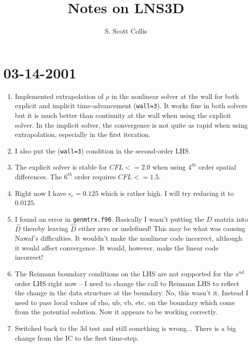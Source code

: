 \documentclass[12pt]{article}
\begin{document}
\title{Notes on LNS3D}
\author{S. Scott Collis}
\maketitle

\section*{03-14-2001}

\begin{enumerate}

\item Implemented extrapolation of $\rho$ in the nonlinear solver at the wall
for both explicit and implicit time-advancement ({\tt wall=3}).  It works fine
in both solvers but it is much better than continuity at the wall when using
the explicit solver.  In the implicit solver, the convergence is not quite as
rapid when using extrapolation, especially in the first iteration.

\item I also put the ({\tt wall=3}) condition in the second-order LHS.

\item The explicit solver is stable for $CFL<=2.0$ when using $4^{th}$ order
spatial differences.  The $6^{th}$ order requires $CFL<=1.5$.

\item Right now I have $\epsilon_e=0.125$ which is rather high.  I will try
reducing it to $0.0125$.

\item I found an error in {\tt genmtrx.f90}.  Basically I wasn't putting the
$D$ matrix into $\hat D$ thereby leaving $\hat D$ either zero or undefined!
This may be what was causing Nawaf's difficulties.  It wouldn't make the
nonlinear code incorrect, although it would affect convergence.  It would,
however, make the linear code incorrect!

\item The Reimann boundary conditions on the LHS are not supported for the
$s^{nd}$ order LHS right now -- I need to change the call to Reimann LHS to
reflect the change in the data structure at the boundary.  No, this wasn't it.
Instead I need to pass local values of rho, ub, vb, etc. on the boundary which
come from the potential solution.  Now it appears to be working correctly.

\item Switched back to the 3d test and still something is wrong...  There is a
big change from the IC to the first time-step.

\end{enumerate}
\end{document}
